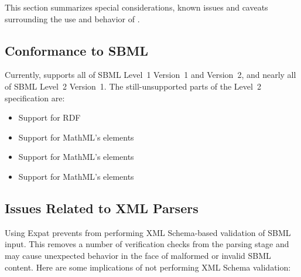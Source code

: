 \documentclass{sbmlmanual}
\begin{document}
This section summarizes special considerations, known issues and caveats
surrounding the use and behavior of \libsbml{}.


\subsection{Conformance to SBML}

Currently, \libsbml{} supports all of SBML Level~1 Version~1 and Version~2,
and nearly all of SBML Level~2 Version~1.  The still-unsupported parts of
the Level~2 specification are:

\begin{itemize}\setlength{\parskip}{-0.25ex}
\item Support for RDF
\item Support for MathML's  elements
\item Support for MathML's  elements
\item Support for MathML's  elements
\end{itemize}


\subsection{Issues Related to XML Parsers}
\label{sec:issues-about-parsers}

Using Expat prevents \libsbml{} from performing XML Schema-based validation
of SBML input.  This removes a number of verification checks from the
parsing stage and may cause unexpected behavior in the face of malformed or
invalid SBML content.  Here are some implications of not performing XML
Schema validation:
\end{document}
